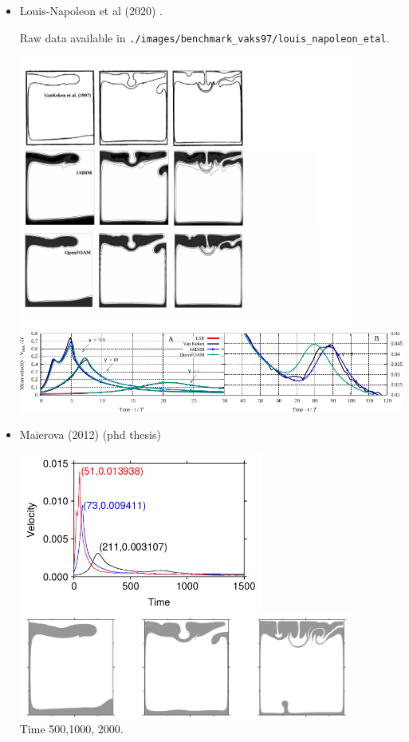 \begin{itemize}
\item Louis-Napoleon et al (2020) \cite{logb20}.

Raw data available in {\tt ./images/benchmark\_vaks97/louis\_napoleon\_etal}.

\begin{center}
\includegraphics[width=11cm]{images/benchmark_vaks97/louis_napoleon_etal/VK1}\\
\includegraphics[width=14cm]{images/benchmark_vaks97/louis_napoleon_etal/VKzoom}
\end{center}

\item Maierova (2012) \cite{maie12} (phd thesis)

\begin{center}
\includegraphics[width=8cm]{images/benchmark_vaks97/maie12_b}
\includegraphics[width=11cm]{images/benchmark_vaks97/maie12_a}\\
{\captionfont Time 500,1000, 2000.}
\end{center}



\end{itemize}
